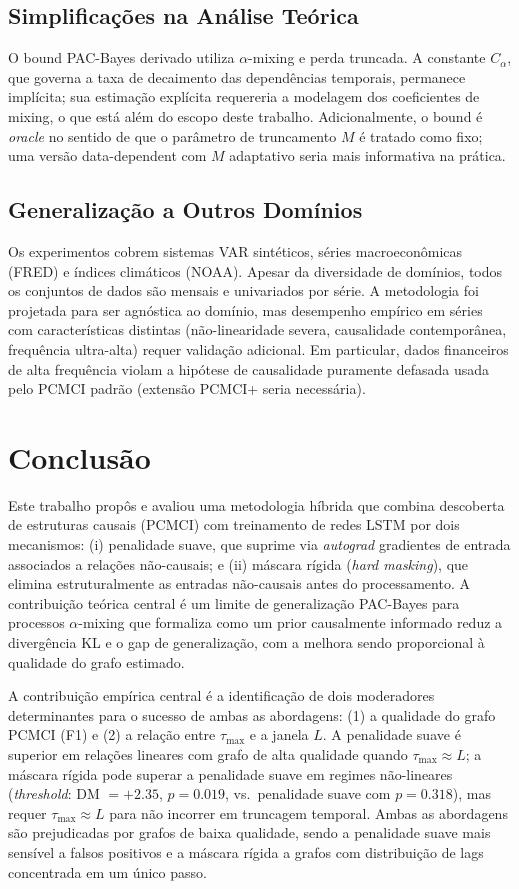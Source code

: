 \documentclass[12pt, a4paper]{article}
\begin{document}
\subsection{Simplificações na Análise Teórica}

O bound PAC-Bayes derivado utiliza $\alpha$-mixing e perda truncada. A constante $C_\alpha$, que governa a taxa de decaimento das dependências temporais, permanece implícita; sua estimação explícita requereria a modelagem dos coeficientes de mixing, o que está além do escopo deste trabalho. Adicionalmente, o bound é \emph{oracle} no sentido de que o parâmetro de truncamento $M$ é tratado como fixo; uma versão data-dependent com $M$ adaptativo seria mais informativa na prática.

\subsection{Generalização a Outros Domínios}

Os experimentos cobrem sistemas VAR sintéticos, séries macroeconômicas (FRED) e índices climáticos (NOAA). Apesar da diversidade de domínios, todos os conjuntos de dados são mensais e univariados por série. A metodologia foi projetada para ser agnóstica ao domínio, mas desempenho empírico em séries com características distintas (não-linearidade severa, causalidade contemporânea, frequência ultra-alta) requer validação adicional. Em particular, dados financeiros de alta frequência violam a hipótese de causalidade puramente defasada usada pelo PCMCI padrão (extensão PCMCI+ \cite{runge2020} seria necessária).


\section{Conclusão}

Este trabalho propôs e avaliou uma metodologia híbrida que combina descoberta de estruturas causais (PCMCI) com treinamento de redes LSTM por dois mecanismos: (i) penalidade suave, que suprime via \emph{autograd} gradientes de entrada associados a relações não-causais; e (ii) máscara rígida (\emph{hard masking}), que elimina estruturalmente as entradas não-causais antes do processamento. A contribuição teórica central é um limite de generalização PAC-Bayes para processos $\alpha$-mixing que formaliza como um prior causalmente informado reduz a divergência KL e o gap de generalização, com a melhora sendo proporcional à qualidade do grafo estimado.

A contribuição empírica central é a identificação de dois moderadores determinantes para o sucesso de ambas as abordagens: (1) a qualidade do grafo PCMCI (F1) e (2) a relação entre $\tau_{\max}$ e a janela $L$. A penalidade suave é superior em relações lineares com grafo de alta qualidade quando $\tau_{\max} \approx L$; a máscara rígida pode superar a penalidade suave em regimes não-lineares (\emph{threshold}: DM $= +2.35$, $p = 0.019$, vs.\ penalidade suave com $p = 0.318$), mas requer $\tau_{\max} \approx L$ para não incorrer em truncagem temporal. Ambas as abordagens são prejudicadas por grafos de baixa qualidade, sendo a penalidade suave mais sensível a falsos positivos e a máscara rígida a grafos com distribuição de lags concentrada em um único passo.
\end{document}
